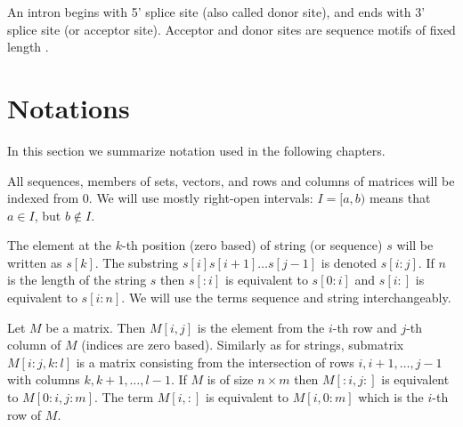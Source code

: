 An intron begins with 5' splice site (also called donor site),  and ends with 3'
splice site (or acceptor site).  Acceptor and donor sites are sequence motifs of
fixed length \cite{Pairagon2009,UnderstandingBioinformatics}.


\section{Notations}

In this section we summarize notation used in the following
chapters.

All sequences, members of sets, vectors, and rows and columns of matrices will
be indexed from $0$. We will use mostly right-open intervals: $I=[a,b)$ means
that $a\in I$, but $b\notin I$. 

The element at the $k$-th position (zero based) of string (or sequence) $s$ will
be written as $s[k]$. The substring $s[i]s[i+1]\dots s[j-1]$ is denoted
$s[i:j]$.  If $n$ is the length of the string $s$ then $s[:i]$ is equivalent to
$s[0:i]$ and $s[i:]$ is equivalent to $s[i:n]$.  We will use the terms sequence
and string interchangeably.

Let $M$ be a matrix. Then $M[i,j]$ is the element from the $i$-th row and $j$-th
column of $M$ (indices are zero based). Similarly as for strings, submatrix
$M[i:j,k:l]$ is a matrix consisting from the intersection of rows $i,i+1,\dots,
j-1$ with columns $k,k+1,\dots,l-1$. If $M$ is of size $n\times m$ then
$M[:i,j:]$ is equivalent to $M[0:i,j:m]$.  The term $M[i,:]$ is equivalent to
$M[i,0:m]$ which is the $i$-th row of $M$.
